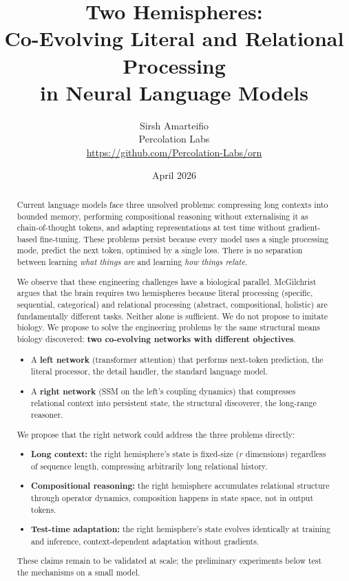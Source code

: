 \documentclass[11pt, a4paper]{article}
\title{%
    \textbf{Two Hemispheres:}\\[4pt]
    \Large Co-Evolving Literal and Relational Processing\\[2pt]
    \large in Neural Language Models%
}
\author{%
    Sirsh Amarteifio\\
    {\small Percolation Labs}\\
    {\small \url{https://github.com/Percolation-Labs/orn}}%
}
\date{April 2026 \quad{\small\textnormal{,  Research Programme}}}
\theoremstyle{plain}
\theoremstyle{definition}
\theoremstyle{remark}
\begin{document}
\maketitle

\begin{abstract}
Current language models face three unsolved problems: compressing long contexts into bounded memory, performing compositional reasoning without externalising it as chain-of-thought tokens, and adapting representations at test time without gradient-based fine-tuning.
These problems persist because every model uses a single processing mode, predict the next token, optimised by a single loss.
There is no separation between learning \emph{what things are} and learning \emph{how things relate}.

We observe that these engineering challenges have a biological parallel.
McGilchrist argues that the brain requires two hemispheres because literal processing (specific, sequential, categorical) and relational processing (abstract, compositional, holistic) are fundamentally different tasks.
Neither alone is sufficient.
We do not propose to imitate biology.
We propose to solve the engineering problems by the same structural means biology discovered: \textbf{two co-evolving networks with different objectives}.

\begin{itemize}[nosep]
\item A \textbf{left network} (transformer attention) that performs next-token prediction, the literal processor, the detail handler, the standard language model.
\item A \textbf{right network} (SSM on the left's coupling dynamics) that compresses relational context into persistent state, the structural discoverer, the long-range reasoner.
\end{itemize}

We propose that the right network could address the three problems directly:
\begin{itemize}[nosep]
\item \textbf{Long context:} the right hemisphere's state is fixed-size ($r$ dimensions) regardless of sequence length, compressing arbitrarily long relational history.
\item \textbf{Compositional reasoning:} the right hemisphere accumulates relational structure through operator dynamics, composition happens in state space, not in output tokens.
\item \textbf{Test-time adaptation:} the right hemisphere's state evolves identically at training and inference, context-dependent adaptation without gradients.
\end{itemize}
These claims remain to be validated at scale; the preliminary experiments below test the mechanisms on a small model.


\end{abstract}
\end{document}
